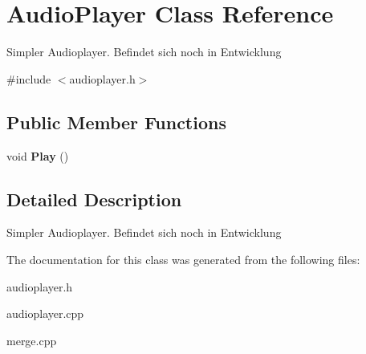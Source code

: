 \hypertarget{class_audio_player}{\section{Audio\-Player Class Reference}
\label{class_audio_player}
}


Simpler Audioplayer. Befindet sich noch in Entwicklung  




{\ttfamily \#include $<$audioplayer.\-h$>$}

\subsection*{Public Member Functions}
\begin{DoxyCompactItemize}
\item 
\hypertarget{class_audio_player_afa3f18ddf21af783358873f91cec4783}{void {\bfseries Play} ()}\label{class_audio_player_afa3f18ddf21af783358873f91cec4783}

\end{DoxyCompactItemize}


\subsection{Detailed Description}
Simpler Audioplayer. Befindet sich noch in Entwicklung 



The documentation for this class was generated from the following files\-:\begin{DoxyCompactItemize}
\item 
audioplayer.\-h\item 
audioplayer.\-cpp\item 
merge.\-cpp\end{DoxyCompactItemize}

